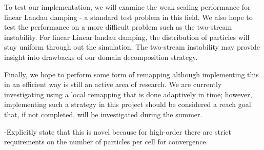 \documentclass[aps,12pt, notitlepage]{revtex4-1}
\renewcommand{\=}[1]{\overline{#1}}
\begin{document}
To test our implementation, we will examine the weak scaling performance for linear Landau damping - a standard test problem in this field. 
We also hope to test the performance on a more difficult problem such as the two-stream instability. 
For linear Linear landau damping, the distribution of particles will stay uniform through out the simulation. 
The two-stream instability may provide insight into drawbacks of our domain decomposition strategy. 

Finally, we hope to perform some form of remapping although implementing this in an efficient way is still an active area of research. 
We are currently investigating using a local remapping that is done adaptively in time; however, implementing such a strategy in this project should be considered a reach goal that, if not completed, will be investigated during the summer. 

-Explicitly state that this is novel because for high-order there are strict requirements on the number of particles per cell for convergence. 


\renewcommand{\refname}{\normalsize\textbf References}
{}
\end{document}
